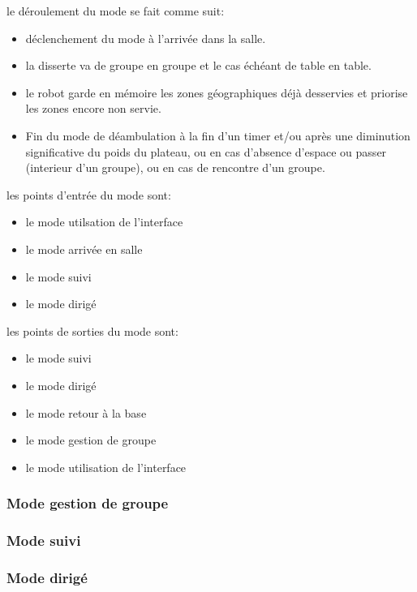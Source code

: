 le déroulement du mode se fait comme suit:
\begin{itemize}
\item déclenchement du mode à l'arrivée dans la salle.
\item la disserte va de groupe en groupe et le cas échéant de table en
  table.
\item le robot garde en mémoire les zones géographiques déjà
  desservies et priorise les zones encore non servie.
\item Fin du mode de déambulation à la fin d'un timer et/ou après une
  diminution significative du poids du plateau, ou en cas d'absence
  d'espace ou passer (interieur d'un groupe), ou en cas de rencontre
  d'un groupe.\\
\end{itemize}

les points d'entrée du mode sont:
\begin{itemize}
\item le mode utilsation de l'interface
\item le mode arrivée en salle
\item le mode suivi
\item le mode dirigé\\
\end{itemize}

les points de sorties du mode sont:
\begin{itemize}
\item le mode suivi
\item le mode dirigé
\item le mode retour à la base
\item le mode gestion de groupe
\item le mode utilisation de l'interface\\
\end{itemize}

\subsubsection{Mode gestion de groupe}

\subsubsection{Mode suivi}

\subsubsection{Mode dirigé}

